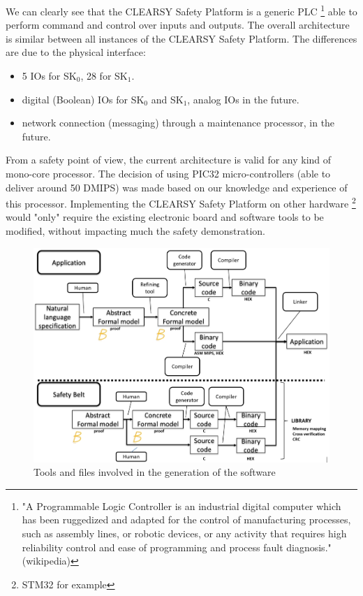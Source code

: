 We can clearly see that the CLEARSY Safety Platform is a generic PLC \footnote{"A Programmable Logic Controller is an industrial digital computer which has been ruggedized and adapted for the control of manufacturing processes, such as assembly lines, or robotic devices, or any activity that requires high reliability control and ease of programming and process fault diagnosis." (wikipedia)} able to perform command and control over inputs and outputs. The overall architecture is similar between all instances of the CLEARSY Safety Platform. The differences are due to the physical interface:
\begin{itemize}
    \item 5 IOs for SK$_0$, 28 for SK$_1$.
    \item digital (Boolean) IOs for SK$_0$ and SK$_1$, analog IOs in the future.
    \item network connection (messaging) through a maintenance processor, in the future.
\end{itemize}

\begin{remark}
From a safety point of view, the current architecture is valid for any kind of mono-core processor. The decision of using PIC32 micro-controllers (able to deliver around 50 DMIPS) was made based on our knowledge and experience of this processor. Implementing the CLEARSY Safety Platform on other hardware \footnote{STM32 for example} would "only" require the existing electronic board and software tools to be modified, without impacting much the safety demonstration.
\end{remark} 

\begin{figure}[h]
\centering\includegraphics[scale=0.35]{Pictures/chapterSafetyPrinciples/ARCH-LCHIP-process.jpg}
\caption{Tools and files involved in the generation of the software}
\label{arch:process}
\end{figure}



